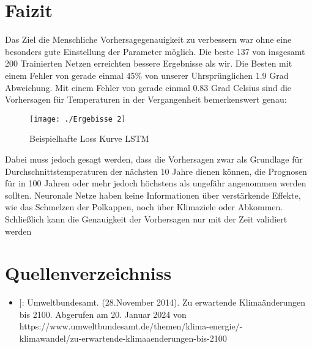 \documentclass[acmtog, authorversion]{acmart} %
\begin{document}
\section{Faizit}
Das Ziel die Menschliche Vorhersagegenauigkeit zu verbessern war ohne eine besonders gute Einstellung der Parameter möglich. Die beste 137 von insgesamt 200 Trainierten Netzen erreichten bessere Ergebnisse als wir. Die Besten mit einem Fehler von gerade einmal 45\% von unserer Uhrsprünglichen 1.9 Grad Abweichung.
Mit einem Fehler von gerade einmal 0.83 Grad Celsius sind die Vorhersagen für Temperaturen in der Vergangenheit bemerkenswert genau:
\begin{figure}[H]
    \centering
    \texttt{[image: ./Ergebisse 2]}
    \label{fig:sub7}
    \caption{Beispielhafte Loss Kurve LSTM}
\end{figure}
Dabei muss jedoch gesagt werden, dass die Vorhersagen zwar als Grundlage für Durchschnittstemperaturen der nächsten 10 Jahre dienen können, die Prognosen für in 100 Jahren oder mehr jedoch höchstens als ungefähr angenommen werden sollten. Neuronale Netze haben keine Informationen über verstärkende Effekte, wie das Schmelzen der Polkappen, noch über Klimaziele oder Abkommen. Schließlich kann die Genauigkeit der Vorhersagen nur mit der Zeit validiert werden

\section{Quellenverzeichniss}
\begin{itemize}
    \item {}]: Umweltbundesamt. (28.November 2014). Zu erwartende Klimaänderungen bis 2100. Abgerufen am 20. Januar 2024 von https://www.umweltbundesamt.de/themen/klima-energie/-\\
    klimawandel/zu-erwartende-klimaaenderungen-bis-2100
\end{itemize}
\end{document}

